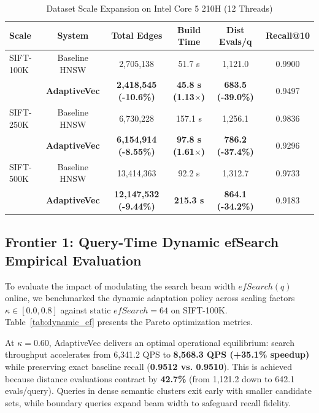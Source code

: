 \documentclass[conference,10pt]{IEEEtran}
\begin{document}
\begin{table}[htbp]
\caption{Dataset Scale Expansion on Intel Core 5 210H (12 Threads)}
\label{tab:scale_expansion}
\centering
\begin{tabular}{lccccc}
\toprule
\textbf{Scale} & \textbf{System} & \textbf{Total Edges} & \textbf{Build Time} & \textbf{Dist Evals/q} & \textbf{Recall@10} \\
\midrule
SIFT-100K & Baseline HNSW & 2,705,138 & 51.7 s & 1,121.0 & 0.9900 \\
          & \textbf{AdaptiveVec} & \textbf{2,418,545 (-10.6\%)} & \textbf{45.8 s (1.13$\times$)} & \textbf{683.5 (-39.0\%)} & 0.9497 \\
\midrule
SIFT-250K & Baseline HNSW & 6,730,228 & 157.1 s & 1,256.1 & 0.9836 \\
          & \textbf{AdaptiveVec} & \textbf{6,154,914 (-8.55\%)} & \textbf{97.8 s (1.61$\times$)} & \textbf{786.2 (-37.4\%)} & 0.9296 \\
\midrule
SIFT-500K & Baseline HNSW & 13,414,363 & 92.2 s & 1,312.7 & 0.9733 \\
          & \textbf{AdaptiveVec} & \textbf{12,147,532 (-9.44\%)} & \textbf{215.3 s} & \textbf{864.1 (-34.2\%)} & 0.9183 \\
\bottomrule
\end{tabular}
\end{table}

\subsection{Frontier 1: Query-Time Dynamic efSearch Empirical Evaluation}
To evaluate the impact of modulating the search beam width $efSearch(q)$ online, we benchmarked the dynamic adaptation policy across scaling factors $\kappa \in [0.0, 0.8]$ against static $efSearch=64$ on SIFT-100K. Table~\ref{tab:dynamic_ef} presents the Pareto optimization metrics.

At $\kappa = 0.60$, AdaptiveVec delivers an optimal operational equilibrium: search throughput accelerates from 6,341.2 QPS to \textbf{8,568.3 QPS (+35.1\% speedup)} while preserving exact baseline recall (\textbf{0.9512 vs. 0.9510}). This is achieved because distance evaluations contract by \textbf{42.7\%} (from 1,121.2 down to 642.1 evals/query). Queries in dense semantic clusters exit early with smaller candidate sets, while boundary queries expand beam width to safeguard recall fidelity.
\end{document}
